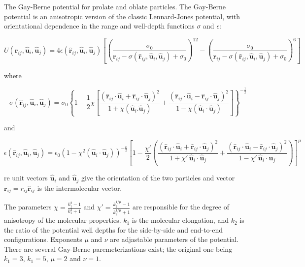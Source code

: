 The Gay-Berne potential for prolate and oblate particles. The
Gay-Berne potential is an anisotropic version of the classic
Lennard-Jones potential, with orientational dependence in the range
and well-depth functions $\sigma$ and $\epsilon$:

\[ U(\mathbf{r}_{ij}, \mathbf{\hat{u}}_i, \mathbf{\hat{u}}_j) = 4
\epsilon(\mathbf{\hat{r}}_{ij}, \mathbf{\hat{u}}_i,
\mathbf{\hat{u}}_j) \left[ \left(\frac
    {\sigma_0}{\mathbf{r}_{ij}-\sigma(\mathbf{\hat{r}}_{ij},
      \mathbf{\hat{u}}_i, \mathbf{\hat{u}}_j)+\sigma_0}\right)^{12}-
  \left(\frac {\sigma_0}{\mathbf{r}_{ij}-\sigma(\mathbf{\hat{r}}_{ij},
      \mathbf{\hat{u}}_i, \mathbf{\hat{u}}_j)+\sigma_0}\right)^{6}
\right] \]

where

\[ \sigma( \mathbf{\hat{r}}_{ij}, \mathbf{\hat{u}}_i,
\mathbf{\hat{u}}_j) = \sigma_{0} \left\{ 1 - \frac{1}{2} \chi \left[
    \frac{ \left( \mathbf{\hat{r}}_{ij} \cdot \mathbf{\hat{u}}_i +
        \mathbf{\hat{r}}_{ij} \cdot \mathbf{\hat{u}}_j \right)^{2} }
    {1 + \chi \left( \mathbf{\hat{u}}_i.\mathbf{\hat{u}}_j \right) } +
    \frac{ \left( \mathbf{\hat{r}}_{ij} \cdot \mathbf{\hat{u}}_i -
        \mathbf{\hat{r}}_{ij} \cdot \mathbf{\hat{u}}_j \right)^{2} }
    {1 - \chi \left( \mathbf{\hat{u}}_i \cdot \mathbf{\hat{u}}_j
      \right) } \right] \right\}^{-\frac{1}{2}} \]

and

\[ \epsilon(\mathbf{\hat{r}}_{ij}, \mathbf{\hat{u}}_i,
\mathbf{\hat{u}}_j) = \epsilon_0 \left( 1- \chi^{2}(\mathbf{\hat{u}}_i
  \cdot \mathbf{\hat{u}}_j) \right)^{-\frac {\nu}{2}} \left[1-\frac
  {\chi'}{2} \left( \frac { (\mathbf{\hat{r}}_{ij} \cdot
      \mathbf{\hat{u}}_i+ \mathbf{\hat{r}}_{ij} \cdot
      \mathbf{\hat{u}}_j)^{2}} {1+\chi' \, \mathbf{\hat{u}}_i \cdot
      \mathbf{\hat{u}}_j }+ \frac {(\mathbf{\hat{r}}_{ij} \cdot
      \mathbf{\hat{u}}_i-\mathbf{\hat{r}}_{ij} \cdot
      \mathbf{\hat{u}}_j)^{2}} {1-\chi' \, \mathbf{\hat{u}}_i \cdot
      \mathbf{\hat{u}}_j } \right) \right]^{\mu} \]

re unit vectors $ \mathbf{\hat{u}}_i $ and $ \mathbf{\hat{u}}_j $ give
the orientation of the two particles and vector $ \mathbf{r}_{ij} =
r_{ij} \mathbf{\hat{r}}_{ij} $ is the intermolecular vector.

The parameters $ \chi = \frac{k_1^{2} - 1}{k_1^{2} + 1 } $ and $ \chi'
= \frac{k_2^{1/\mu} - 1}{k_2^{1/\mu} + 1 } $ are responsible for the
degree of anisotropy of the molecular properties. $ k_1 $ is the
molecular elongation, and $ k_2 $ is the ratio of the potential well
depths for the side-by-side and end-to-end configurations. Exponents $
\mu $ and $ \nu $ are adjastable parameters of the potential. There
are several Gay-Berne paremeterizations exist; the original one being
$ k_1 = 3 $, $ k_1 = 5 $, $ \mu = 2 $ and $ \nu = 1 $.

